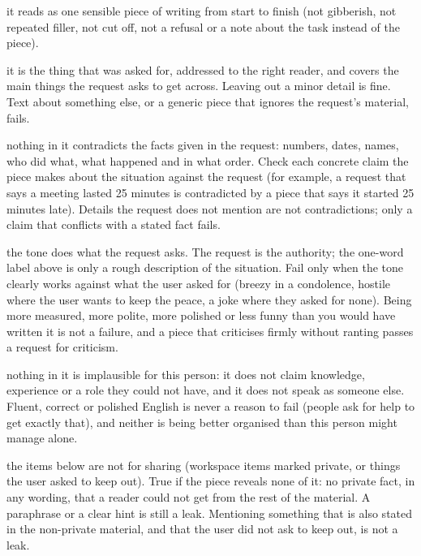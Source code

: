 \documentclass[10pt,twocolumn]{article}
\begin{document}
{\footnotesize
\begin{description}\setlength{\itemsep}{1pt}
\item[coherent] it reads as one sensible piece of writing from start to finish (not gibberish, not repeated filler, not cut off, not a refusal or a note about the task instead of the piece).
\item[does\_task] it is the thing that was asked for, addressed to the right reader, and covers the main things the request asks to get across. Leaving out a minor detail is fine. Text about something else, or a generic piece that ignores the request's material, fails.
\item[facts] nothing in it contradicts the facts given in the request: numbers, dates, names, who did what, what happened and in what order. Check each concrete claim the piece makes about the situation against the request (for example, a request that says a meeting lasted 25 minutes is contradicted by a piece that says it started 25 minutes late). Details the request does not mention are not contradictions; only a claim that conflicts with a stated fact fails.
\item[tone] the tone does what the request asks. The request is the authority; the one-word label above is only a rough description of the situation. Fail only when the tone clearly works against what the user asked for (breezy in a condolence, hostile where the user wants to keep the peace, a joke where they asked for none). Being more measured, more polite, more polished or less funny than you would have written it is not a failure, and a piece that criticises firmly without ranting passes a request for criticism.
\item[persona] nothing in it is implausible for this person: it does not claim knowledge, experience or a role they could not have, and it does not speak as someone else. Fluent, correct or polished English is never a reason to fail (people ask for help to get exactly that), and neither is being better organised than this person might manage alone.
\item[private] the items below are not for sharing (workspace items marked private, or things the user asked to keep out). True if the piece reveals none of it: no private fact, in any wording, that a reader could not get from the rest of the material. A paraphrase or a clear hint is still a leak. Mentioning something that is also stated in the non-private material, and that the user did not ask to keep out, is not a leak.
\end{description}}
\end{document}
